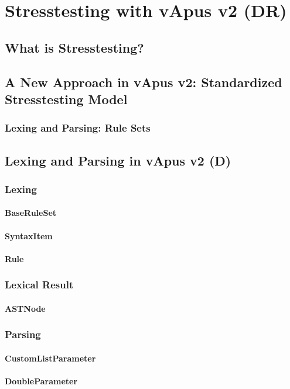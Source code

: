 \section{Stresstesting with vApus v2 (DR)}
\subsection{What is Stresstesting?}
\subsection{A New Approach in vApus v2: Standardized Stresstesting Model}
\subsubsection{Lexing and Parsing: Rule Sets}
\subsection{Lexing and Parsing in vApus v2 (D)}
\subsubsection{Lexing}
\paragraph{BaseRuleSet}
\paragraph{SyntaxItem}
\paragraph{Rule}
\subsubsection{Lexical Result}
\paragraph{ASTNode}
\subsubsection{Parsing}
\paragraph{CustomListParameter}
\paragraph{DoubleParameter}
